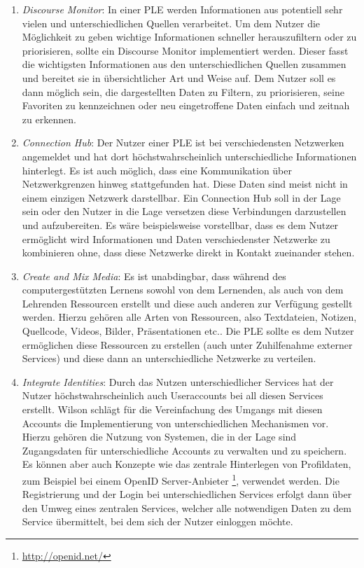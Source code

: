 \begin{enumerate}
 \item \emph{Discourse Monitor}\label{wilson_patterns:discourse_monitor}: In einer PLE werden Informationen aus potentiell sehr vielen und unterschiedlichen Quellen verarbeitet. Um dem Nutzer die Möglichkeit zu geben wichtige Informationen schneller herauszufiltern oder zu priorisieren, sollte ein Discourse Monitor implementiert werden. Dieser fasst die wichtigsten Informationen aus den unterschiedlichen Quellen zusammen und bereitet sie in übersichtlicher Art und Weise auf. Dem Nutzer soll es dann möglich sein, die dargestellten Daten zu Filtern, zu priorisieren, seine Favoriten zu kennzeichnen oder neu eingetroffene Daten einfach und zeitnah zu erkennen. 
 \item \emph{Connection Hub}: Der Nutzer einer PLE ist bei verschiedensten Netzwerken angemeldet und hat dort höchstwahrscheinlich unterschiedliche Informationen hinterlegt. Es ist auch möglich, dass eine Kommunikation über Netzwerkgrenzen hinweg stattgefunden hat. Diese Daten sind meist nicht in einem einzigen Netzwerk darstellbar. Ein Connection Hub soll in der Lage sein oder den Nutzer in die Lage versetzen diese Verbindungen darzustellen und aufzubereiten. Es wäre beispielsweise vorstellbar, dass es dem Nutzer ermöglicht wird Informationen und Daten verschiedenster Netzwerke zu kombinieren ohne, dass diese Netzwerke direkt in Kontakt zueinander stehen.
 \item \emph{Create and Mix Media}: Es ist unabdingbar, dass während des computergestützten Lernens sowohl von dem Lernenden, als auch von dem Lehrenden Ressourcen erstellt und diese auch anderen zur Verfügung gestellt werden. Hierzu gehören alle Arten von Ressourcen, also Textdateien, Notizen, Quellcode, Videos, Bilder, Präsentationen etc.. Die PLE sollte es dem Nutzer ermöglichen diese Ressourcen zu erstellen (auch unter Zuhilfenahme externer Services) und diese dann an unterschiedliche Netzwerke zu verteilen. 
 \item \emph{Integrate Identities}: Durch das Nutzen unterschiedlicher Services hat der Nutzer höchstwahrscheinlich auch Useraccounts bei all diesen Services erstellt. Wilson schlägt für die Vereinfachung des Umgangs mit diesen Accounts die Implementierung von unterschiedlichen Mechanismen vor. Hierzu gehören die Nutzung von Systemen, die in der Lage sind Zugangsdaten für unterschiedliche Accounts zu verwalten und zu speichern. Es können aber auch Konzepte wie das zentrale Hinterlegen von Profildaten, zum Beispiel bei einem OpenID Server-Anbieter \footnote{\url{http://openid.net/}}, verwendet werden. Die Registrierung und der Login bei unterschiedlichen Services erfolgt dann über den Umweg eines zentralen Services, welcher alle notwendigen Daten zu dem Service übermittelt, bei dem sich der Nutzer einloggen möchte.  

\end{enumerate}

